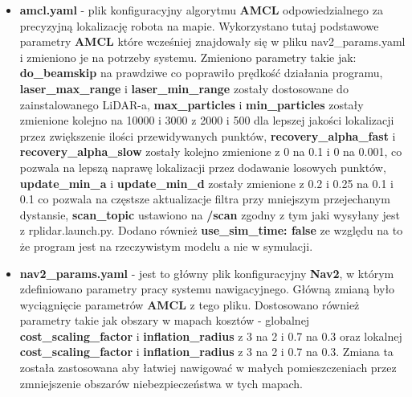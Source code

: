 \documentclass[a4paper,twoside,12pt]{book}
\begin{document}
\begin{itemize}
	\item \textbf{amcl.yaml} - plik konfiguracyjny algorytmu \textbf{AMCL} odpowiedzialnego za precyzyjną lokalizację robota na mapie.
	Wykorzystano tutaj podstawowe parametry \textbf{AMCL} które wcześniej znajdowały się w pliku nav2\_params.yaml i zmieniono je na potrzeby systemu. 
	 Zmieniono parametry takie jak: 
	\newline \textbf{do\_beamskip} na prawdziwe co poprawiło prędkość działania programu,
	\newline \textbf{laser\_max\_range} i \textbf{laser\_min\_range} zostały dostosowane do zainstalowanego LiDAR-a, 
	\newline \textbf{max\_particles} i \textbf{min\_particles} zostały zmienione kolejno na 10000 i 3000 z 2000 i 500 dla lepszej jakości lokalizacji przez zwiększenie ilości przewidywanych punktów, 
	\newline \textbf{recovery\_alpha\_fast} i \textbf{recovery\_alpha\_slow} zostały kolejno zmienione z 0 na 0.1 i 0 na 0.001, co pozwala na lepszą naprawę lokalizacji przez dodawanie losowych punktów, 
	\newline \textbf{update\_min\_a} i \textbf{update\_min\_d} zostały zmienione z 0.2 i 0.25 na 0.1 i 0.1 co pozwala na częstsze aktualizacje filtra przy mniejszym przejechanym dystansie, 
	\newline \textbf{scan\_topic} ustawiono na \textbf{/scan} zgodny z tym jaki wysyłany jest z rplidar.launch.py. 
	\newline Dodano również \textbf{use\_sim\_time: false} ze względu na to że program jest na rzeczywistym modelu a nie w symulacji.




	\item \textbf{nav2\_params.yaml} - jest to główny plik konfiguracyjny \textbf{Nav2}, w którym zdefiniowano parametry pracy systemu nawigacyjnego. Główną zmianą było wyciągnięcie parametrów \textbf{AMCL} z tego pliku. Dostosowano również parametry takie jak obszary w mapach kosztów - globalnej \textbf{cost\_scaling\_factor} i \textbf{inflation\_radius} z 3 na 2 i 0.7 na 0.3 oraz lokalnej \textbf{cost\_scaling\_factor} i \textbf{inflation\_radius} z 3 na 2 i 0.7 na 0.3. Zmiana ta została zastosowana aby łatwiej nawigować w małych pomieszczeniach przez zmniejszenie obszarów niebezpieczeństwa w tych mapach.
	\end{itemize}
\newpage
\end{document}
